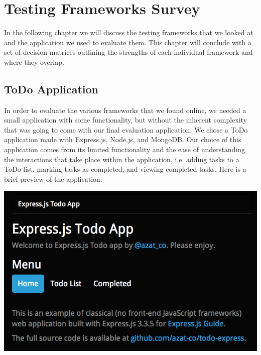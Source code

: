 \documentclass[12pt]{ucthesis}
\newenvironment{Figure}
  {\par\medskip\noindent\minipage{\linewidth}}
  {\endminipage\par\medskip}
\begin{document}
\chapter{Testing Frameworks Survey}
In the following chapter we will discuss the testing frameworks that we looked at and the application we used to evaluate them. This chapter will conclude with a set of decision matrices outlining the strengths of each individual framework and where they overlap.

\section{ToDo Application}
In order to evaluate the various frameworks that we found online, we needed a small application with some functionality, but without the inherent complexity that was going to come with our final evaluation application. We chose a ToDo application made with Express.js, Node.js, and MongoDB.\cite{ToDoAppHomePage} Our choice of this application comes from its limited functionality and the ease of understanding the interactions that take place within the application, i.e. adding tasks to a ToDo list, marking tasks as completed, and viewing completed tasks. Here is a brief preview of the application:

\begin{Figure}
  \centering
  \includegraphics[width=0.75\linewidth]{todo_home.png}
  
  
\end{Figure}
\end{document}
